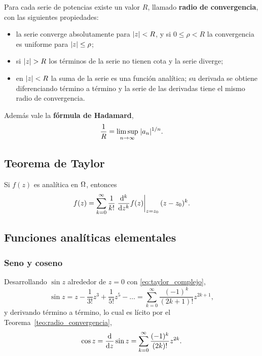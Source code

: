 \begin{teorema}
  \label{teo:radio_convergencia}
  Para cada serie de potencias existe un valor $R$, llamado \textbf{radio de
  convergencia}, con las siguientes propiedades:
  \begin{itemize}
    \item la serie converge absolutamente para $\lvert z \rvert<R$, y si
          $0\le\rho<R$ la convergencia es uniforme para $\lvert z \rvert\le\rho$;
    \item si $\lvert z \rvert>R$ los t\'erminos de la serie no tienen cota y la serie
          diverge;
    \item en $\lvert z \rvert<R$ la suma de la serie es una funci\'on anal\'itica; su
          derivada se obtiene diferenciando t\'ermino a t\'ermino y la serie
          de las derivadas tiene el mismo radio de convergencia.
  \end{itemize}
  Adem\'as vale la \textbf{f\'ormula de Hadamard},
  \begin{equation}
    \label{eq:hadamard}
    \frac{1}{R}=\limsup_{n\rightarrow\infty}\;\lvert a_n \rvert^{1/n} .
  \end{equation}
\end{teorema}

\subsection{Teorema de Taylor}
\label{subsec:taylor_complejo}

\begin{teorema}[Taylor]
  \label{teo:taylor}
  Si $f(z)$ es anal\'itica en $\Omega$, entonces
  \begin{equation}
    \label{eq:taylor_complejo}
    f(z)=\sum_{k=0}^{\infty}\frac{1}{k!}
      \left. \frac{\mathrm{d}^{k}}{\mathrm{d}z^{k}}f(z) \right|_{z=z_0}(z-z_0)^k .
  \end{equation}
\end{teorema}

\subsection{Funciones anal\'iticas elementales}
\label{subsec:funciones_analiticas}

\subsubsection{Seno y coseno}
\label{subsubsec:seno_coseno}

Desarrollando $\sin z$ alrededor de $z=0$ con \eqref{eq:taylor_complejo},
\begin{equation}
  \label{eq:serie_seno}
  \sin z=z-\frac{1}{3!}z^3+\frac{1}{5!}z^5-\dots
    =\sum_{k=0}^{\infty}\frac{(-1)^k}{(2k+1)!}z^{2k+1},
\end{equation}
y derivando t\'ermino a t\'ermino, lo cual es l\'icito por el
Teorema~\ref{teo:radio_convergencia},
\begin{equation}
  \label{eq:serie_coseno}
  \cos z=\frac{\mathrm{d}}{\mathrm{d}z}\sin z
    =\sum_{k=0}^{\infty}\frac{(-1)^k}{(2k)!}z^{2k} .
\end{equation}

